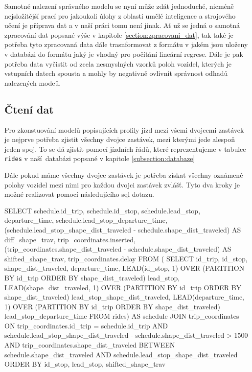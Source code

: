 Samotné nalezení správného modelu se nyní může zdát jednoduché, nicméně nejsložitější prací pro jakoukoli úlohy z oblasti umělé inteligence a strojového učení je příprava dat a v naší práci tomu není jinak. Ať už se jedná o samotná zpracování dat popsané výše v kapitole \ref{section:zpracovani_dat}, tak také je potřeba tyto zpracovaná data dále trasnformovat z formátu v jakém jsou uloženy v databázi do formátu jaký je vhodný pro počítání lineární regrese. Dále je pak potřeba data vyčistit od zcela nesmyslných vzorků poloh vozidel, kterých je vstupních datech spousta a mohly by negativně ovlivnit správnost odhadů nalezených modeů.

\subsection{Čtení dat} \label{subsection:cteni_dat}

Pro zkonstuování modelů popisujících profily jízd mezi všemi dvojcemi zastávek je nejprve potřeba zjistit všechny dvojce zastávek, mezi kterými jede alespoň jeden spoj. To se dá zjistit pomocí jízdních řádů, které reprezentujeme v tabulce \verb-rides- v naší databázi popsané v kapitole \ref{subsection:databaze}

\bigbreak

 Dále pokud máme všechny dvojce zastávek je potřeba získat všechny oznámené polohy vozidel mezi nimi pro každou dvojci zastávek zvlášť. Tyto dva kroky je možné realizovat pomocí následujícího \gls{sql} dotazu.

\begin{code}[frame=none]
SELECT schedule.id_trip,
  schedule.id_stop,
  schedule.lead_stop,
  departure_time,
  schedule.lead_stop_departure_time,
  (schedule.lead_stop_shape_dist_traveled - schedule.shape_dist_traveled)
    AS diff_shape_trav,
  trip_coordinates.inserted,
  (trip_coordinates.shape_dist_traveled - schedule.shape_dist_traveled)
    AS shifted_shape_trav,
  trip_coordinates.delay
FROM (
  SELECT id_trip, id_stop, shape_dist_traveled, departure_time,
    LEAD(id_stop, 1) OVER (PARTITION BY
	  id_trip ORDER BY shape_dist_traveled) lead_stop,
    LEAD(shape_dist_traveled, 1) OVER (PARTITION BY
	  id_trip ORDER BY shape_dist_traveled) lead_stop_shape_dist_traveled,
    LEAD(departure_time, 1) OVER (PARTITION BY
	  id_trip ORDER BY shape_dist_traveled) lead_stop_departure_time
  FROM rides) AS schedule
JOIN trip_coordinates
ON trip_coordinates.id_trip = schedule.id_trip AND
  schedule.lead_stop_shape_dist_traveled -
    schedule.shape_dist_traveled > 1500 AND
  trip_coordinates.shape_dist_traveled
    BETWEEN schedule.shape_dist_traveled AND
  schedule.lead_stop_shape_dist_traveled
ORDER BY id_stop, lead_stop, shifted_shape_trav
\end{code}

